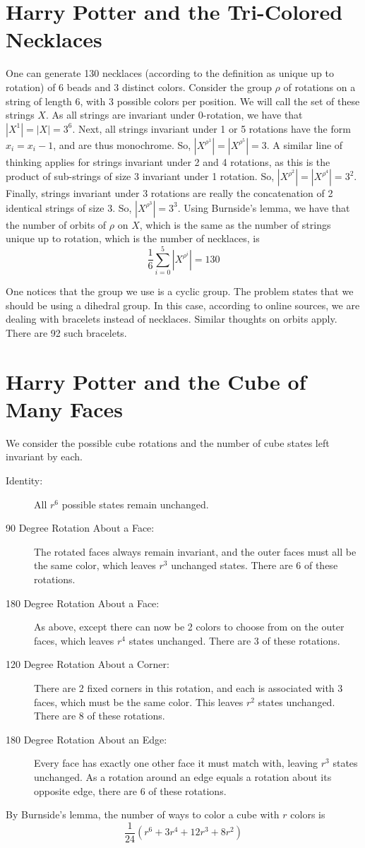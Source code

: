\documentclass[12pt]{article}
\begin{document}
\section{Harry Potter and the Tri-Colored Necklaces}
One can generate 130 necklaces (according to the definition as unique up to rotation) of 6 beads and 3 distinct colors. Consider the group $\rho$ of rotations on a string of length 6, with 3 possible colors per position. We will call the set of these strings $X$. As all strings are invariant under 0-rotation, we have that $|X^1| = |X| = 3^6$. Next, all strings invariant under 1 or 5 rotations have the form $x_i = x_i - 1$, and are thus monochrome. So, $|X^{\rho ^ 1}| = |X^{\rho ^ 5}| = 3$. A similar line of thinking applies for strings invariant under 2 and 4 rotations, as this is the product of sub-strings of size 3 invariant under 1 rotation. So, $|X^{\rho ^ 2}| = |X^{\rho ^ 4}| = 3^2$. Finally, strings invariant under 3 rotations are really the concatenation of 2 identical strings of size 3. So, $|X^{\rho ^ 3}| = 3^3$. Using Burnside's lemma, we have that the number of orbits of $\rho$ on $X$, which is the same as the number of strings unique up to rotation, which is the number of necklaces, is \[\frac{1}{6}\sum_{i = 0}^5 |X^{\rho ^ i}| = 130\]

One notices that the group we use is a cyclic group. The problem states that we should be using a dihedral group. In this case, according to online sources, we are dealing with bracelets instead of necklaces. Similar thoughts on orbits apply. There are 92 such bracelets.

\section{Harry Potter and the Cube of Many Faces}
We consider the possible cube rotations and the number of cube states left invariant by each.
\begin{description}
\item[Identity:] All $r^6$ possible states remain unchanged.
\item[90 Degree Rotation About a Face:] The rotated faces always remain invariant, and the outer faces must all be the same color, which leaves $r^3$ unchanged states. There are 6 of these rotations.
\item[180 Degree Rotation About a Face:] As above, except there can now be 2 colors to choose from on the outer faces, which leaves $r^4$ states unchanged. There are 3 of these rotations.
\item[120 Degree Rotation About a Corner:] There are 2 fixed corners in this rotation, and each is associated with 3 faces, which must be the same color. This leaves $r^2$ states unchanged. There are 8 of these rotations.
\item[180 Degree Rotation About an Edge:] Every face has exactly one other face it must match with, leaving $r^3$ states unchanged. As a rotation around an edge equals a rotation about its opposite edge, there are 6 of these rotations.
\end{description}

By Burnside's lemma, the number of ways to color a cube with $r$ colors is
\[\frac{1}{24} \left( r^6 + 3r^4 + 12r^3 + 8r^2 \right)\]
\end{document}
